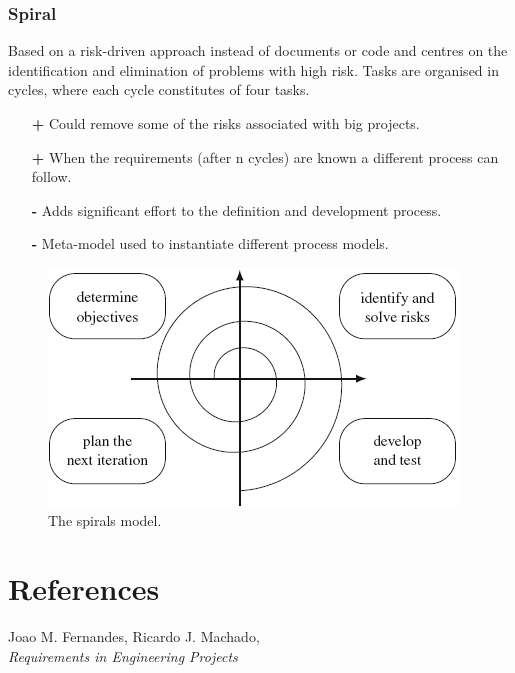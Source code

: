 \clearpage
\subsection*{Spiral \cite{req_en_book}}
Based on a risk-driven approach instead of documents or code and centres on the identification and elimination of problems with high risk. Tasks are organised in cycles, where each cycle constitutes of four tasks.
\begin{itemize}
	\item[\textbf{+}] Could remove some of the risks associated with big projects.
	\item[\textbf{+}] When the requirements (after n cycles) are known a different process can follow.
	\item[\textbf{-}] Adds significant effort to the definition and development process.
	\item[\textbf{-}] Meta-model used to instantiate different process models.
\end{itemize}
\begin{figure}[h]
	\centering
	\includegraphics[width=0.75\linewidth]{Resources/4_spiral.png}
	\caption{The spirals model.}
	\label{fig:transformational}
\end{figure} 


\chapter{References}

\begin{thebibliography}{9}
	
	Joao M. Fernandes, Ricardo J. Machado, \\
	\emph{Requirements in Engineering Projects}
	
\end{thebibliography}


\appendix



